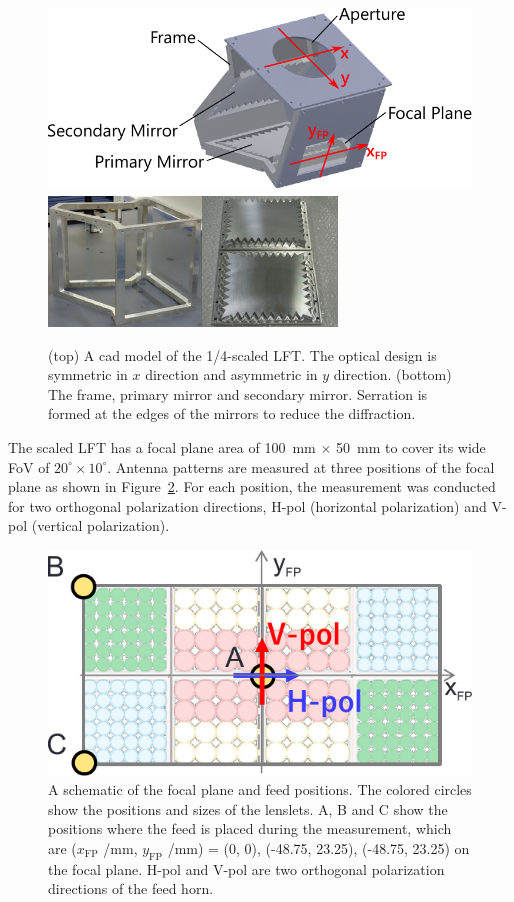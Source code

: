 \documentclass[journal]{IEEEtran}
\newcommand{\red}[1]{\textcolor{red}{#1}}
\begin{document}
\begin{figure}
\centering
\includegraphics[width=0.8\linewidth]{Figures/LFT_BBM_CAD.pdf}
\includegraphics[width=0.9\linewidth]{Figures/Frame_and_Mirrors.pdf}
\caption{(top) A cad model of the 1/4-scaled LFT. The optical design is symmetric in $x$ direction and asymmetric in $y$ direction. (bottom) The frame, primary mirror and secondary mirror. Serration is formed at the edges of the mirrors to reduce the diffraction.}
\label{fig:cad-frame-mirrors}
\end{figure}
\par
The scaled LFT has a focal plane area of 100~mm $\times$ 50~mm to cover its wide FoV of $20^\circ \times 10^\circ$.  
Antenna patterns are measured at three positions of the focal plane as shown in Figure~\ref{fig:FeedPos}. For each position, the measurement was conducted for two orthogonal polarization directions, H-pol (horizontal polarization) and V-pol (vertical polarization).
%
\begin{figure}[!t]
\centering
\includegraphics[width=0.8\linewidth]{Figures/FeedPos.pdf}
\caption{A schematic of the focal plane and feed positions. The colored circles show the positions and sizes of the lenslets. A, B and C show the positions where the feed is placed during the measurement, which are ($x_\mathrm{FP}$ /mm, $y_\mathrm{FP}$ /mm) = (0, 0), (-48.75, 23.25), (-48.75, 23.25) on the focal plane. H-pol and V-pol are two orthogonal polarization directions of the feed horn.}
\label{fig:FeedPos}
\end{figure}
\end{document}
